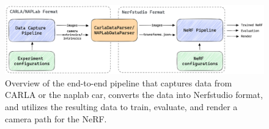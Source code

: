 \begin{figure}[ht]
    \centering
    \includegraphics[width=1.0\textwidth]{figures/end-to-end-pipeline-v2.png}
    \caption[Overview of the end-to-end pipeline.]{Overview of the end-to-end pipeline that captures data from CARLA or the \acrshort{naplab} car, converts the data into Nerfstudio format, and utilizes the resulting data to train, evaluate, and render a camera path for the NeRF.}
    \label{fig:end-to-end-pipeline}
\end{figure}